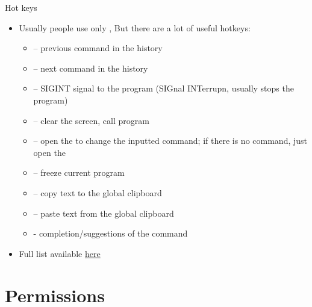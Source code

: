 \documentclass[usenames,dvipsnames,10pt,aspectratio=169]{beamer}
\begin{document}
\begin{frame}{Hot keys}
    \begin{itemize}
        \item Usually people use only , But there are a lot of useful hotkeys:
            \begin{itemize}
                \item {} -- previous command in the history
                \item {} -- next command in the history 
                \item {} -- SIGINT signal to the program (SIGnal INTerrupn, usually stops the program)
                \item {} -- clear the screen, call  program
                \item {} -- open the  to change the inputted command; if there is no command, just open the 
                \item {} -- freeze current program
                \item {} -- copy text to the global clipboard
                \item {} -- paste text from the global clipboard
                \item {} - completion/suggestions of the command
            \end{itemize}
        \item Full list available \href{https://telegra.ph/BashGoryachie-klavishi-09-17}{here}
    \end{itemize}
\end{frame}


\section{Permissions}

\end{document}
